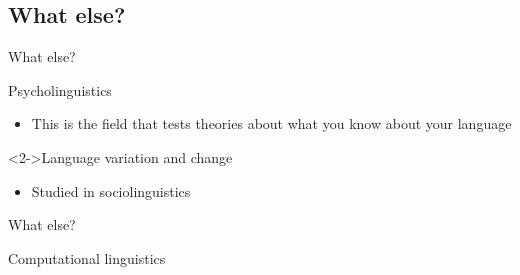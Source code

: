 \documentclass{beamer}
\newcommand{\subtwofive}{What else?}
\begin{document}
    \subsection{\subtwofive}
      \begin{frame}{\subtwofive}
        \begin{block}{Psycholinguistics}
          
          \begin{itemize}
            \item This is the field that tests theories about what you know about your language
          \end{itemize}
        \end{block}
        \begin{block}<2->{Language variation and change}
          
          \begin{itemize}
            \item Studied in sociolinguistics
          \end{itemize}
        \end{block}
      \end{frame}

      \begin{frame}{\subtwofive}
        \begin{block}{Computational linguistics}
          
        \end{block}
      \end{frame}
\end{document}
